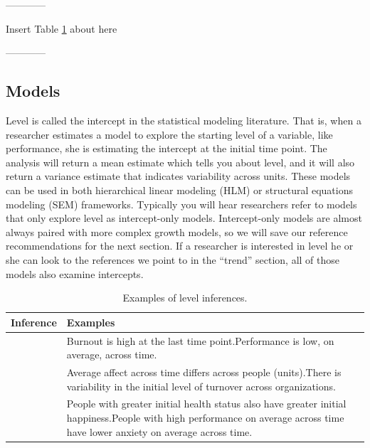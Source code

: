 \documentclass[english,,man]{apa6}
\theoremstyle{definition}
\theoremstyle{definition}
\theoremstyle{definition}
\theoremstyle{remark}
\begin{document}
\begin{center}

------------

Insert Table \ref{level_table} about here

------------

\end{center}

\hypertarget{models}{%
\subsection{Models}\label{models}}

Level is called the intercept in the statistical modeling literature.
That is, when a researcher estimates a model to explore the starting
level of a variable, like performance, she is estimating the intercept
at the initial time point. The analysis will return a mean estimate
which tells you about level, and it will also return a variance estimate
that indicates variability across units. These models can be used in
both hierarchical linear modeling (HLM) or structural equations modeling
(SEM) frameworks. Typically you will hear researchers refer to models
that only explore level as intercept-only models. Intercept-only models
are almost always paired with more complex growth models, so we will
save our reference recommendations for the next section. If a researcher
is interested in level he or she can look to the references we point to
in the \enquote{trend} section, all of those models also examine
intercepts.

\begin{table}

\caption{\label{tab:unnamed-chunk-7}\label{level_table}Examples of level inferences.}
\centering
\begin{tabular}[t]{>{\raggedright\arraybackslash}p{5em}>{\raggedright\arraybackslash}p{30em}}
\toprule
Inference & Examples\\
\midrule
1 & Burnout is high at the last time point.\newline Performance is low, on average, across time.\\
\hline
2 & Average affect across time differs across people (units).\newline There is variability in the initial level of turnover across organizations.\\
\hline
3 & People with greater initial health status also have greater initial happiness.\newline People with high performance on average across time have lower anxiety on average across time.\\
\bottomrule
\end{tabular}
\end{table}
\end{document}
